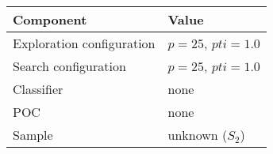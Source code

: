 \begin{tabular}{ll}
\hline
Component                    & Value         \\
\hline
Exploration configuration   & $p = 25$, $pti = 1.0$          \\
Search configuration        & $p = 25$, $pti = 1.0$          \\
Classifier                  & none          \\
POC                         & none          \\
Sample                      & unknown ($S_2$) \\
\hline
\end{tabular}